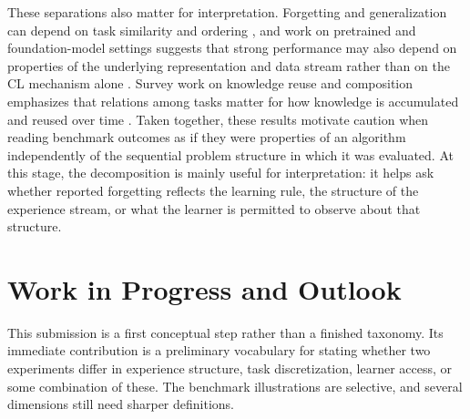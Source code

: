 \documentclass{article} %
\begin{document}
These separations also matter for interpretation. Forgetting and generalization can depend on task similarity and ordering \citep{bell2022effect,doan2021theoretical,hiratani2024disentangling,lin2023theory,li2025optimal,ramasesh2020anatomy}, and work on pretrained and foundation-model settings suggests that strong performance may also depend on properties of the underlying representation and data stream rather than on the CL mechanism alone \citep{ostapenko2022continual,thede2024reflecting}. Survey work on knowledge reuse and composition emphasizes that relations among tasks matter for how knowledge is accumulated and reused over time \citep{mendez2022reuse}. Taken together, these results motivate caution when reading benchmark outcomes as if they were properties of an algorithm independently of the sequential problem structure in which it was evaluated. At this stage, the decomposition is mainly useful for interpretation: it helps ask whether reported forgetting reflects the learning rule, the structure of the experience stream, or what the learner is permitted to observe about that structure.



\section{Work in Progress and Outlook}
This submission is a first conceptual step rather than a finished taxonomy. Its immediate contribution is a preliminary vocabulary for stating whether two experiments differ in experience structure, task discretization, learner access, or some combination of these. The benchmark illustrations are selective, and several dimensions still need sharper definitions.
\end{document}
